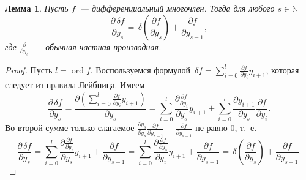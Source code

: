 \documentclass[11pt]{article}
\DeclareMathOperator{\ord}{ord}
\theoremstyle{plain1}
\newtheorem{lemma}[theorem1]{Лемма}
\theoremstyle{plain2}
\theoremstyle{plain}
\theoremstyle{plain3}
\theoremstyle{definition}
\theoremstyle{remark}
\begin{document}
\begin{lemma}\label{lemma:commutative derivatives}
Пусть $f$~--- дифференциальный многочлен. Тогда для любого $s\in\mathbb{N}$ 
$$
\frac{\partial \,\delta f}{\partial y_s}=\,\delta \left(\frac{\partial f}{\partial y_s}\right)+\frac{\partial f}{\partial y_{s-1}},
$$
где $\frac{\partial}{\partial y_s}$~--- обычная частная производная.
\end{lemma}
\begin{proof}
Пусть $l=\ord f$.
Воспользуемся формулой $\,\delta f=\sum\limits_{i=0}^l\frac{\partial f}{\partial y_i}y_{i+1}$, которая следует из правила Лейбница. Имеем 
$$
\frac{\partial \,\delta f}{\partial y_s}=\frac{\partial\left(\sum\limits_{i=0}^l\frac{\partial f}{\partial y_i}y_{i+1}\right)}{\partial y_s}=\sum\limits_{i=0}^l\frac{\partial \frac{\partial f}{\partial y_i} }{\partial y_s}y_{i+1}+\sum\limits_{i=0}^l\frac{\partial y_{i+1}}{\partial y_s}\frac{\partial f}{\partial y_i}.
$$
Во второй сумме только слагаемое 
$\frac{\partial y_{s}}{\partial y_s}\frac{\partial f}{\partial y_{s-1}}=\frac{\partial f}{\partial y_{s-1}}$ 
не равно 0, т.~е. 
$$
\frac{\partial \,\delta f}{\partial y_s}=\sum\limits_{i=0}^l\frac{\partial \frac{\partial f}{\partial y_i}}{\partial y_s}y_{i+1}+\frac{\partial f}{\partial y_{s-1}}=\sum\limits_{i=0}^l\frac{\partial \frac{\partial f}{\partial y_s}}{\partial y_i}y_{i+1}+\frac{\partial f}{\partial y_{s-1}}=\,\delta\left(\frac{\partial f}{\partial y_s}\right)+\frac{\partial f}{\partial y_{s-1}}.
$$
\end{proof}
\end{document}
